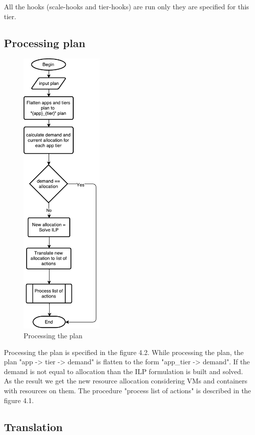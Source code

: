 All the hooks (scale-hooks and tier-hooks) are run only they are specified for this tier.


\subsection{Processing plan}
\begin{figure}[ht]
  \centering
    \includegraphics[height=550px,natwidth=202,natheight=714]{./pictures/algorithm2}
    \caption{Processing the plan }
\end{figure}
Processing the plan is specified in the figure 4.2.
While processing the plan, the plan "app -\textgreater{} tier -\textgreater{} demand" is flatten to the form "app\_tier -\textgreater{} demand". 
If the demand is not equal to allocation than the ILP formulation is built and solved. As the result we get the new resource allocation considering VMs and containers with resources on them.
The procedure "process list of actions" is described in the figure 4.1.

\clearpage
\subsection{Translation}

